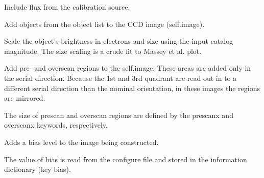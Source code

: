 \documentclass[a4paper,12pt,english]{sphinxmanual}
\begin{document}
\begin{fulllineitems}
\begin{fulllineitems}
\end{fulllineitems}


\begin{fulllineitems}
\label{simulator:simulator.simulator.VISsimulator.addLampFlux}
Include flux from the calibration source.

\end{fulllineitems}


\begin{fulllineitems}
\label{simulator:simulator.simulator.VISsimulator.addObjects}
Add objects from the object list to the CCD image (self.image).

Scale the object's brightness in electrons and size using the input catalog magnitude.
The size scaling is a crude fit to Massey et al. plot.

\end{fulllineitems}


\begin{fulllineitems}
\label{simulator:simulator.simulator.VISsimulator.addPreOverScans}
Add pre- and overscan regions to the self.image. These areas are added only in the serial direction.
Because the 1st and 3rd quadrant are read out in to a different serial direction than the nominal
orientation, in these images the regions are mirrored.

The size of prescan and overscan regions are defined by the prescanx and overscanx keywords, respectively.

\end{fulllineitems}


\begin{fulllineitems}
\label{simulator:simulator.simulator.VISsimulator.applyBias}
Adds a bias level to the image being constructed.

The value of bias is read from the configure file and stored
in the information dictionary (key bias).


\end{fulllineitems}
\end{fulllineitems}
\end{document}
